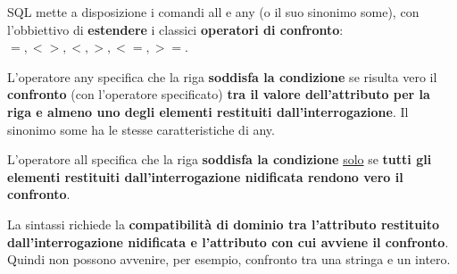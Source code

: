 \documentclass[a4paper]{article}
\begin{document}
	SQL mette a disposizione i comandi \textcolor{Red3}{\textsf{all}} e \textcolor{Red3}{\textsf{any}} (o il suo sinonimo \textcolor{Red3}{\textsf{some}}), con l'obbiettivo di \textbf{estendere} i classici \textbf{operatori di confronto}: $=, <>, <, >, <=, >=$.\newline
	
	\noindent
	L'operatore \textcolor{Red3}{\textsf{any}} specifica che la riga \textbf{soddisfa la condizione} se risulta vero il \textbf{confronto} (con l'operatore specificato) \textbf{tra il valore dell'attributo per la riga e almeno uno degli elementi restituiti dall'interrogazione}. Il sinonimo \textcolor{Red3}{\textsf{some}} ha le stesse caratteristiche di \textsf{any}.\newline
	
	\noindent
	L'operatore \textcolor{Red3}{\textsf{all}} specifica che la riga \textbf{soddisfa la condizione} \underline{solo} se \textbf{tutti gli elementi restituiti dall'interrogazione nidificata rendono vero il confronto}.\newline
	
	\noindent
	La sintassi richiede la \textbf{compatibilità di dominio tra l'attributo restituito dall'interrogazione nidificata e l'attributo con cui avviene il confronto}. Quindi non possono avvenire, per esempio, confronto tra una stringa e un intero.\newline
	
\end{document}
